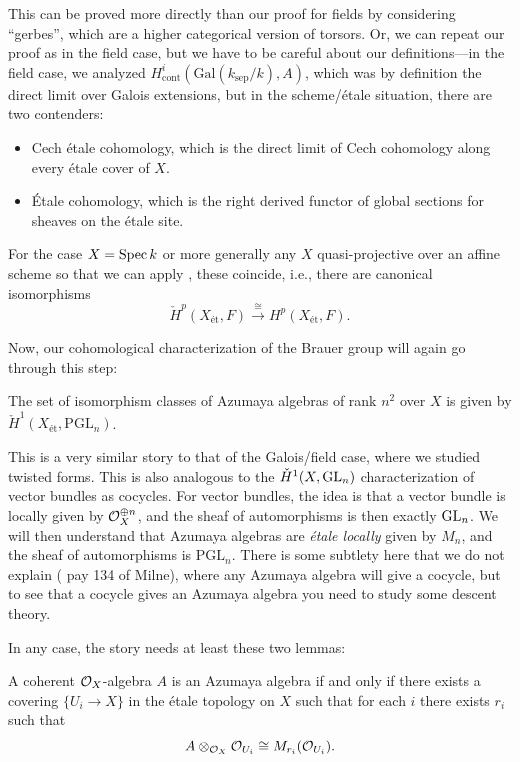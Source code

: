 \documentclass[12pt]{article}
\newcommand{\et}{\text{\'{e}t}}
\newcommand{\sep}{\text{sep}}
\newcommand{\Gal}{\mathrm{Gal}}
\newcommand{\PGL}{\mathrm{PGL}}
\begin{document}
This can be proved more directly than our proof for fields by considering ``gerbes'', which are a higher categorical version of torsors. Or, we can repeat our proof as in the field case, but we have to be careful about our definitions---in the field case, we analyzed $H^i_{\text{cont}}(\Gal(k_\sep/k),A)$, which was by definition the direct limit over Galois extensions, but in the scheme/\'etale situation, there are two contenders:
\begin{itemize}
    \item Cech \'etale cohomology, which is the direct limit of Cech cohomology along every \'etale cover of $X$.
    \item \'Etale cohomology, which is the right derived functor of global sections for sheaves on the \'etale site.
\end{itemize}
For the case $X=\operatorname{Spec} k$ or more generally any $X$ quasi-projective over an affine scheme so that we can apply \cite{milne_etale_2025,Theorem 2.12}, these coincide, i.e., there are canonical isomorphisms
\[\check{H}^p(X_\et, F) \xrightarrow{\cong} H^p(X_\et,F).\]

Now, our cohomological characterization of the Brauer group will again go through this step:

\begin{thm}
    The set of isomorphism classes of Azumaya algebras of rank $n^2$ over $X$ is given by $\check{H}^1(X_\et, \PGL_n)$.
\end{thm}

This is a very similar story to that of the Galois/field case, where we studied twisted forms. This is also analogous to the $\check{H}^1(X, \mathrm{GL}_n)$ characterization of vector bundles as cocycles. For vector bundles, the idea is that a vector bundle is locally given by $\mathcal{O}_X^{\oplus n}$, and the sheaf of automorphisms is then exactly $\mathrm{GL}_n$. We will then understand that Azumaya algebras are \textit{\'etale locally} given by $M_n$, and the sheaf of automorphisms is $\PGL_n$. There is some subtlety here that we do not explain ({\color{red} pay 134 of Milne}), where any Azumaya algebra will give a cocycle, but to see that a cocycle gives an Azumaya algebra you need to study some descent theory.

In any case, the story needs at least these two lemmas:

\begin{lem}
    A coherent $\mathcal{O}_X$-algebra $A$ is an Azumaya algebra if and only if there exists a covering $\{U_i \to X\}$ in the \'etale topology on $X$ such that for each $i$ there exists $r_i$ such that
    \[A\otimes_{\mathcal{O}_X} \mathcal{O}_{U_i} \cong M_{r_i}(\mathcal{O}_{U_i}).\]
\end{lem}
\end{document}
